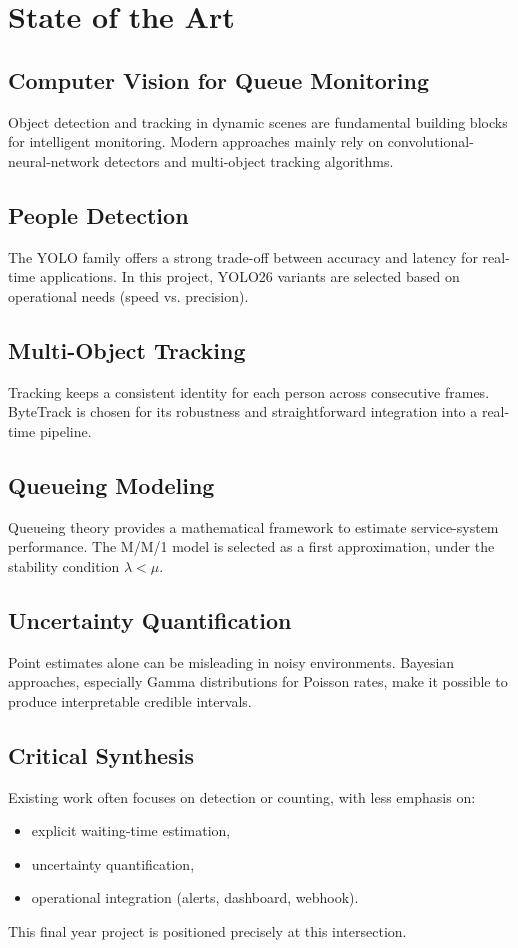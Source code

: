 \chapter{State of the Art}
\chaptertoc

\section{Computer Vision for Queue Monitoring}
Object detection and tracking in dynamic scenes are fundamental building blocks for intelligent monitoring.
Modern approaches mainly rely on convolutional-neural-network detectors and multi-object tracking algorithms.

\section{People Detection}
The YOLO family offers a strong trade-off between accuracy and latency for real-time applications.
In this project, YOLO26 variants are selected based on operational needs (speed vs. precision).

\section{Multi-Object Tracking}
Tracking keeps a consistent identity for each person across consecutive frames.
ByteTrack is chosen for its robustness and straightforward integration into a real-time pipeline.

\section{Queueing Modeling}
Queueing theory provides a mathematical framework to estimate service-system performance.
The M/M/1 model is selected as a first approximation, under the stability condition $\lambda < \mu$.

\section{Uncertainty Quantification}
Point estimates alone can be misleading in noisy environments.
Bayesian approaches, especially Gamma distributions for Poisson rates, make it possible to produce interpretable credible intervals.

\section{Critical Synthesis}
Existing work often focuses on detection or counting, with less emphasis on:
\begin{itemize}
    \item explicit waiting-time estimation,
    \item uncertainty quantification,
    \item operational integration (alerts, dashboard, webhook).
\end{itemize}
This final year project is positioned precisely at this intersection.
